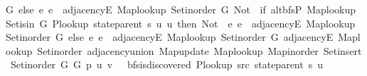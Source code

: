 \begin{isabellebody}
{\isacharquery}{\kern0pt}G{}{\isachardot}{\kern0pt}{}{\isacharparenright}{\kern0pt}\ else\ {\isacharparenleft}{\kern0pt}{\isasymlambda}e{\isachardot}{\kern0pt}\ e\ {\isasymin}\ adjacency{\isachardot}{\kern0pt}E\ {\isacharquery}{\kern0pt}Map{\isacharunderscore}{\kern0pt}lookup\ {\isacharquery}{\kern0pt}Set{\isacharunderscore}{\kern0pt}inorder\ {\isacharquery}{\kern0pt}G{}{\isachardot}{\kern0pt}{}{\isacharparenright}{\kern0pt}{\isacharparenright}{\kern0pt}\ {\isacharparenleft}{\kern0pt}Not\ {\isasymcirc}\ {\isacharparenleft}{\kern0pt}if\ alt{\isacharunderscore}{\kern0pt}bfs{\isachardot}{\kern0pt}P{\isacharprime}{\kern0pt}\ {\isacharquery}{\kern0pt}Map{\isacharunderscore}{\kern0pt}lookup\ {\isacharquery}{\kern0pt}Set{\isacharunderscore}{\kern0pt}isin\ {\isacharquery}{\kern0pt}G{}{\isachardot}{\kern0pt}{}\ {\isacharparenleft}{\kern0pt}{\isacharquery}{\kern0pt}P{\isacharunderscore}{\kern0pt}lookup\ {\isacharparenleft}{\kern0pt}state{\isachardot}{\kern0pt}parent\ {\isacharquery}{\kern0pt}s{\isacharparenright}{\kern0pt}\ {\isacharquery}{\kern0pt}u{\isacharparenright}{\kern0pt}\ {\isacharquery}{\kern0pt}u\ then\ Not\ {\isasymcirc}\ {\isacharparenleft}{\kern0pt}{\isasymlambda}e{\isachardot}{\kern0pt}\ e\ {\isasymin}\ adjacency{\isachardot}{\kern0pt}E\ {\isacharquery}{\kern0pt}Map{\isacharunderscore}{\kern0pt}lookup\ {\isacharquery}{\kern0pt}Set{\isacharunderscore}{\kern0pt}inorder\ {\isacharquery}{\kern0pt}G{}{\isachardot}{\kern0pt}{}{\isacharparenright}{\kern0pt}\ else\ {\isacharparenleft}{\kern0pt}{\isasymlambda}e{\isachardot}{\kern0pt}\ e\ {\isasymin}\ adjacency{\isachardot}{\kern0pt}E\ {\isacharquery}{\kern0pt}Map{\isacharunderscore}{\kern0pt}lookup\ {\isacharquery}{\kern0pt}Set{\isacharunderscore}{\kern0pt}inorder\ {\isacharquery}{\kern0pt}G{}{\isachardot}{\kern0pt}{}{\isacharparenright}{\kern0pt}{\isacharparenright}{\kern0pt}{\isacharparenright}{\kern0pt}\ {\isacharparenleft}{\kern0pt}adjacency{\isachardot}{\kern0pt}E\ {\isacharquery}{\kern0pt}Map{\isacharunderscore}{\kern0pt}lookup\ {\isacharquery}{\kern0pt}Set{\isacharunderscore}{\kern0pt}inorder\ {\isacharparenleft}{\kern0pt}adjacency{\isachardot}{\kern0pt}union\ {\isacharquery}{\kern0pt}Map{\isacharunderscore}{\kern0pt}update\ {\isacharquery}{\kern0pt}Map{\isacharunderscore}{\kern0pt}lookup\ {\isacharquery}{\kern0pt}Map{\isacharunderscore}{\kern0pt}inorder\ {\isacharquery}{\kern0pt}Set{\isacharunderscore}{\kern0pt}insert\ {\isacharquery}{\kern0pt}Set{\isacharunderscore}{\kern0pt}inorder\ {\isacharquery}{\kern0pt}G{}{\isachardot}{\kern0pt}{}\ {\isacharquery}{\kern0pt}G{}{\isachardot}{\kern0pt}{}{\isacharparenright}{\kern0pt}{\isacharparenright}{\kern0pt}\ {\isacharquery}{\kern0pt}p\ {\isacharquery}{\kern0pt}u\ {\isacharquery}{\kern0pt}v{\isacharsemicolon}{\kern0pt}\ {\isasymnot}\ {\isasymnot}\ bfs{\isachardot}{\kern0pt}is{\isacharunderscore}{\kern0pt}discovered\ {\isacharquery}{\kern0pt}P{\isacharunderscore}{\kern0pt}lookup\ {\isacharquery}{\kern0pt}src\ {\isacharparenleft}{\kern0pt}state{\isachardot}{\kern0pt}parent\ {\isacharquery}{\kern0pt}s{\isacharparenright}{\kern0pt}\ {\isacharquery}{\kern0pt}u{\isacharsemicolon}{\kern0pt}\ 
\end{isabellebody}
